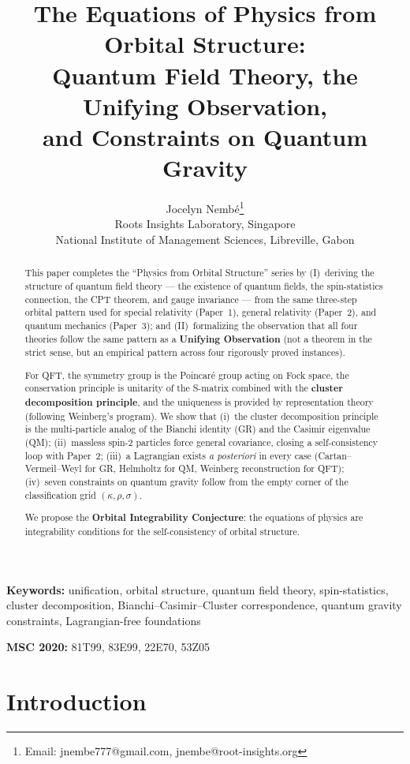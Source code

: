 \documentclass[12pt]{article}
\title{\textbf{The Equations of Physics from Orbital Structure:\\Quantum Field Theory, the Unifying Observation,\\and Constraints on Quantum Gravity}}
\author{Jocelyn Nemb\'e\thanks{Email: jnembe777@gmail.com, jnembe@root-insights.org}\\[0.3em]
\small Roots Insights Laboratory, Singapore\\
\small National Institute of Management Sciences, Libreville, Gabon}
\date{}
\theoremstyle{plain}
\theoremstyle{definition}
\theoremstyle{remark}
\begin{document}
\maketitle

\begin{abstract}
This paper completes the ``Physics from Orbital Structure'' series by (I)~deriving the structure of quantum field theory --- the existence of quantum fields, the spin-statistics connection, the CPT theorem, and gauge invariance --- from the same three-step orbital pattern used for special relativity (Paper~1), general relativity (Paper~2), and quantum mechanics (Paper~3); and (II)~formalizing the observation that all four theories follow the same pattern as a \textbf{Unifying Observation} (not a theorem in the strict sense, but an empirical pattern across four rigorously proved instances).

For QFT, the symmetry group is the Poincar\'e group acting on Fock space, the conservation principle is unitarity of the S-matrix combined with the \textbf{cluster decomposition principle}, and the uniqueness is provided by representation theory (following Weinberg's program). We show that (i)~the cluster decomposition principle is the multi-particle analog of the Bianchi identity (GR) and the Casimir eigenvalue (QM); (ii)~massless spin-2 particles force general covariance, closing a self-consistency loop with Paper~2; (iii)~a Lagrangian exists \emph{a posteriori} in every case (Cartan--Vermeil--Weyl for GR, Helmholtz for QM, Weinberg reconstruction for QFT); (iv)~seven constraints on quantum gravity follow from the empty corner of the classification grid $(\kappa, \rho, \sigma)$.

We propose the \textbf{Orbital Integrability Conjecture}: the equations of physics are integrability conditions for the self-consistency of orbital structure.
\end{abstract}

\noindent\textbf{Keywords:} unification, orbital structure, quantum field theory, spin-statistics, cluster decomposition, Bianchi--Casimir--Cluster correspondence, quantum gravity constraints, Lagrangian-free foundations

\noindent\textbf{MSC 2020:} 81T99, 83E99, 22E70, 53Z05


\section{Introduction}
\label{sec:intro}
\end{document}
